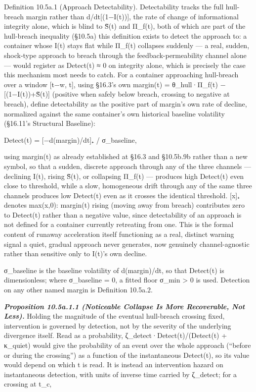 \documentclass[
]{article}
\begin{document}
Definition 10.5a.1 (Approach Detectability). Detectability tracks the
full hull-breach margin rather than d/dt{[}(1−I(t)){]}, the rate of
change of informational integrity alone, which is blind to S̃(t) and
Π\_f(t), both of which are part of the hull-breach inequality (§10.5a)
this definition exists to detect the approach to: a container whose I(t)
stays flat while Π\_f(t) collapses suddenly --- a real, sudden,
shock-type approach to breach through the feedback-permeability channel
alone --- would register as Detect(t) ≈ 0 on integrity alone, which is
precisely the case this mechanism most needs to catch. For a container
approaching hull-breach over a window {[}t−w, t{]}, using §16.3's own
margin(t) = θ\_hull·Π\_f(t) − {[}(1−I(t))+S̃(t){]} (positive when safely
below breach, crossing to negative at breach), define detectability as
the positive part of margin's own rate of decline, normalized against
the same container's own historical baseline volatility (§16.11's
Structural Baseline):

Detect(t) = {[}−d(margin)/dt{]}₊ / σ\_baseline,

using margin(t) as already established at §16.3 and §10.5b.9b rather
than a new symbol, so that a sudden, discrete approach through any of
the three channels --- declining I(t), rising S̃(t), or collapsing
Π\_f(t) --- produces high Detect(t) even close to threshold, while a
slow, homogeneous drift through any of the same three channels produces
low Detect(t) even as it crosses the identical threshold. {[}x{]}₊
denotes max(x,0): margin(t) rising (moving away from breach) contributes
zero to Detect(t) rather than a negative value, since detectability of
an approach is not defined for a container currently retreating from
one. This is the formal content of runaway acceleration itself
functioning as a real, distinct warning signal a quiet, gradual approach
never generates, now genuinely channel-agnostic rather than sensitive
only to I(t)'s own decline.

σ\_baseline is the baseline volatility of d(margin)/dt, so that
Detect(t) is dimensionless; where σ\_baseline = 0, a fitted floor σ\_min
\textgreater{} 0 is used. Detection on any other named margin is
Definition 10.5a.2.

\emph{\textbf{Proposition 10.5a.1.1 (Noticeable Collapse Is More
Recoverable, Not Less).}} Holding the magnitude of the eventual
hull-breach crossing fixed, intervention is governed by detection, not
by the severity of the underlying divergence itself. Read as a
probability, ζ\_detect·Detect(t)/(Detect(t) + κ\_quiet) would give the
probability of an event over the whole approach (``before or during the
crossing'') as a function of the instantaneous Detect(t), so its value
would depend on which t is read. It is instead an intervention hazard on
instantaneous detection, with units of inverse time carried by
ζ\_detect; for a crossing at t\_c,
\end{document}
